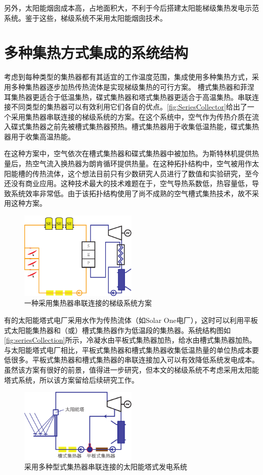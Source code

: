 另外，太阳能烟囱成本高，占地面积大，不利于今后搭建太阳能梯级集热发电示范系统。鉴于这些，梯级系统不采用太阳能烟囱技术。

\section{多种集热方式集成的系统结构}
\label{sec:csc}
考虑到每种类型的集热器都有其适宜的工作温度范围，集成使用多种集热方式，采用多种集热器逐步加热传热流体是实现梯级集热的可行方案。
槽式集热器和菲涅耳集热器更适合于低温集热，碟式集热器和塔式集热器更适合于高温集热。串联连接不同类型的集热器可以有效利用它们各自的优点。\autoref{fig:SeriesCollector}给出了一个采用集热器串联连接的梯级系统的方案。在这个系统中，空气作为传热介质在流入碟式集热器之前先被槽式集热器预热。槽式集热器用于收集低温热能，碟式集热器用于收集高温热能。

在这种方案中，空气依次在槽式集热器和碟式集热器中被加热。为斯特林机提供热量后，热空气流入换热器为朗肯循环提供热量。在这种拓扑结构中，空气被用作太阳能槽的传热流体，这个想法目前只有少数研究人员进行了数值和实验研究，至今还没有商业应用\cite{Good2015,Good2016}。这种技术最大的技术难题在于，空气导热系数低，热容量低，导致系统效率非常低。由于该拓扑结构使用了尚不成熟的空气槽式集热技术，故不采用这种方案。
\begin{figure}[htbp]
\centering 
\includegraphics[width=0.5\textwidth]{fig/SeriesCollector}
\caption{一种采用集热器串联连接的梯级系统方案}\label{fig:SeriesCollector}
\end{figure}

有的太阳能塔式电厂采用水作为传热流体（如Solar One电厂），这时可以利用平板式太阳能集热器和（或）槽式集热器作为低温段的集热器。系统结构图如\autoref{fig:seriesCollection}所示，冷凝水由平板式集热器加热，给水由槽式集热器加热。与太阳能塔式电厂相比，平板式集热器和槽式集热器收集低温热量的单位热成本要低很多。平板式集热器和槽式集热器的串联连接加入可以有效降低系统发电成本。虽然该方案有很好的前景，值得进一步研究，但本文的梯级系统不考虑采用太阳能塔式系统，所以该方案留给后续研究工作。

\begin{figure}[htbp]
\centering 
\includegraphics[width=0.5\textwidth]{fig/SeriesCollection}
\caption{采用多种型式集热器串联连接的太阳能塔式发电系统}\label{fig:seriesCollection}
\end{figure}

